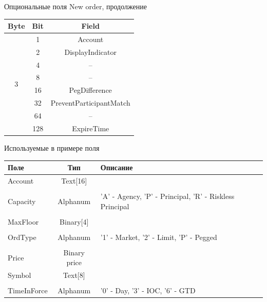 \documentclass[unknownkeysallowed,xcolor=table]{beamer}
\begin{document}
\begin{frame}{Опциональные поля New order, продолжение}

\begin{center}
\begin{tabular}{ |c|c|c| }
  \hline
    Byte & Bit  & Field \\
  \hline
    \multirow{8}{*}{3} & 1 & Account \\
      & 2 & DisplayIndicator \\
      & 4 & -- \\
      & 8 & -- \\
      & 16 & PegDifference \\
      & 32 & PreventParticipantMatch \\
      & 64 & -- \\
      & 128 & ExpireTime \\
  \hline
\end{tabular}
\end{center}

\end{frame}

\begin{frame}{Используемые в примере поля}

\begin{center}
\begin{tabular}{ |l|c|m{12em}| }
  \hline
    Поле & Тип & Описание \\
  \hline
    Account & Text[16] & \\
    & & \\
    Capacity & Alphanum & 'A' - Agency, 'P' - Principal, 'R' - Riskless Principal \\
    & & \\
    MaxFloor & Binary[4] & \\
    & & \\
    OrdType & Alphanum & '1' - Market, '2' - Limit, 'P' - Pegged \\
    & & \\
    Price & Binary price & \\
    Symbol & Text[8] & \\
    & & \\
    TimeInForce & Alphanum & '0' - Day, '3' - IOC, '6' - GTD \\
  \hline
\end{tabular}
\end{center}

\end{frame}
\end{document}
